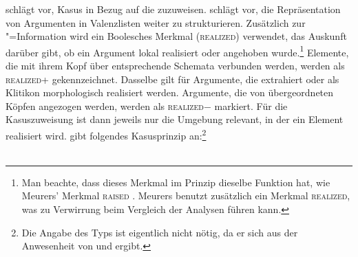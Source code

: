 \citet{Prze99} schlägt vor, Kasus in Bezug auf die \argstl zuzuweisen. 
%
\citeauthor{Prze99} schlägt vor, die Repräsentation von Argumenten in Valenzlisten
weiter zu strukturieren. Zusätzlich zur "=Information wird
ein Boolesches Merkmal (\textsc{realized}\label{page-realized}) verwendet,
das Auskunft darüber gibt, ob ein Argument lokal realisiert 
oder angehoben wurde.\footnote{%
  Man beachte, dass dieses Merkmal im Prinzip dieselbe Funktion hat, wie Meurers' Merkmal
  \textsc{raised} \citep{Meurers99b}. Meurers benutzt zusätzlich ein Merkmal \textsc{realized}, was zu
  Verwirrung beim Vergleich der Analysen führen kann.
} Elemente, die mit ihrem Kopf über entsprechende Schemata verbunden werden, werden als
\textsc{realized}+ gekennzeichnet. Dasselbe gilt für Argumente, die extrahiert oder als
Klitikon morphologisch realisiert werden.
Argumente, die von übergeordneten Köpfen angezogen werden, werden als
\textsc{realized}$-$ markiert. Für die Kasuszuweisung ist dann jeweils nur
die Umgebung relevant, in der ein Element realisiert wird.
\citet[]{Prze99} gibt folgendes Kasusprinzip an:\footnote{%
  Die Angabe des Typs  ist eigentlich nicht nötig, da er sich aus der Anwesenheit von
  \head und \argst ergibt.
}
\eal
\label{case-prz}
\ex {} \impl \\
    \mbox{}\hfill{}
\ex\label{case-prz-acc}
 \impl \\

